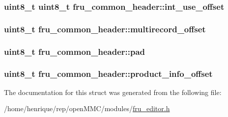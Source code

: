\hypertarget{structfru__common__header_a234f8a64b8169d629910422d894a76b7}{
\subsubsection[{int\-\_\-use\-\_\-offset}]{\setlength{\rightskip}{0pt plus 5cm}uint8\-\_\-t uint8\-\_\-t fru\-\_\-common\-\_\-header\-::int\-\_\-use\-\_\-offset}}\label{structfru__common__header_a234f8a64b8169d629910422d894a76b7}
\hypertarget{structfru__common__header_af9ddba6fcd3a12b53ea6dd571efba1a5}{
\subsubsection[{multirecord\-\_\-offset}]{\setlength{\rightskip}{0pt plus 5cm}uint8\-\_\-t fru\-\_\-common\-\_\-header\-::multirecord\-\_\-offset}}\label{structfru__common__header_af9ddba6fcd3a12b53ea6dd571efba1a5}
\hypertarget{structfru__common__header_a4530d71330dcaa5965775f7a6742f923}{
\subsubsection[{pad}]{\setlength{\rightskip}{0pt plus 5cm}uint8\-\_\-t fru\-\_\-common\-\_\-header\-::pad}}\label{structfru__common__header_a4530d71330dcaa5965775f7a6742f923}
\hypertarget{structfru__common__header_ac11a8480218c4e5a8a2f3e8ed326eb32}{
\subsubsection[{product\-\_\-info\-\_\-offset}]{\setlength{\rightskip}{0pt plus 5cm}uint8\-\_\-t fru\-\_\-common\-\_\-header\-::product\-\_\-info\-\_\-offset}}\label{structfru__common__header_ac11a8480218c4e5a8a2f3e8ed326eb32}


The documentation for this struct was generated from the following file\-:\begin{DoxyCompactItemize}
\item 
/home/henrique/rep/open\-M\-M\-C/modules/\hyperlink{fru__editor_8h}{fru\-\_\-editor.\-h}\end{DoxyCompactItemize}
